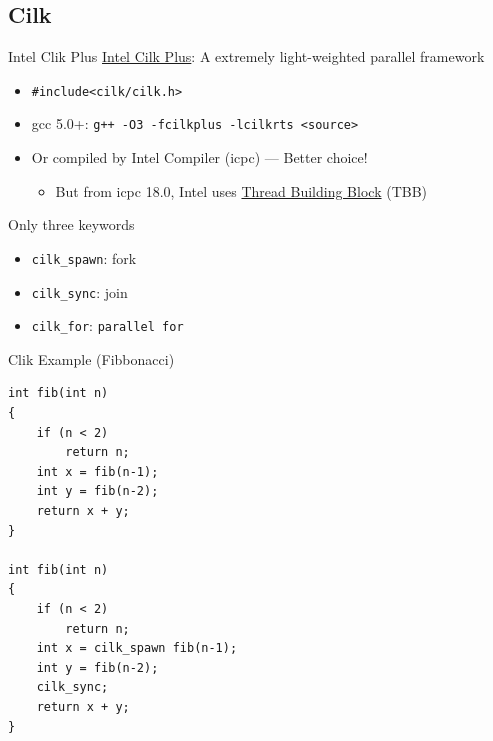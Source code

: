 \documentclass{../TexTemplate/myslide}
\begin{document}
\subsection{Cilk}
\begin{frame}
\subsectionpage
\end{frame}

\begin{frame}[fragile]{Intel Clik Plus}
\href{https://www.cilkplus.org/}{Intel Cilk Plus}: A extremely light-weighted parallel framework
\begin{itemize}
	\item \verb'#include<cilk/cilk.h>'
	\item gcc 5.0+: \verb'g++ -O3 -fcilkplus -lcilkrts <source>'
	\item Or compiled by Intel Compiler (icpc) --- Better choice!
	\begin{itemize}
		\item But from icpc 18.0, Intel uses \href{https://software.intel.com/en-us/articles/migrate-your-application-to-use-openmp-or-intelr-tbb-instead-of-intelr-cilktm-plus?_ga=2.174275746.1279103381.1550824040-508775473.1544510410}{Thread Building Block} (TBB)
	\end{itemize}
\end{itemize}
Only three keywords
\begin{itemize}
	\item \verb'cilk_spawn': fork
	\item \verb'cilk_sync': join
	\item \verb'cilk_for': \verb'parallel for'
\end{itemize}
\end{frame}

\begin{frame}[fragile]{Clik Example (Fibbonacci)}
\begin{lstlisting}
int fib(int n)
{
    if (n < 2)
        return n;
    int x = fib(n-1);
    int y = fib(n-2);
    return x + y;
}

int fib(int n)
{
    if (n < 2)
        return n;
    int x = cilk_spawn fib(n-1);
    int y = fib(n-2);
    cilk_sync;
    return x + y;
}
\end{lstlisting}
\end{frame}
\end{document}
